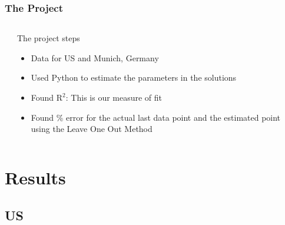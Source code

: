 \documentclass[11pt,letterpaper]{beamer}
\begin{document}
	\begin{frame}
	\frametitle{The Project}
	\begin{columns}
		\begin{column}{.5\textwidth}
			\begin{table}
			\end{table}
		\end{column}
		\begin{column}{.5\textwidth}
			The project steps
			\begin{itemize}
				\item Data for US and Munich, Germany
				\item Used Python to estimate the parameters in the solutions
				\item Found $ \text{R}^2 $: This is our measure of fit
				\item Found \% error for the actual last data point and the estimated point using the Leave One Out Method
			\end{itemize}
		\end{column}
	\end{columns}

	\end{frame}
	
\section{Results}

\subsection{US}
\end{document}

